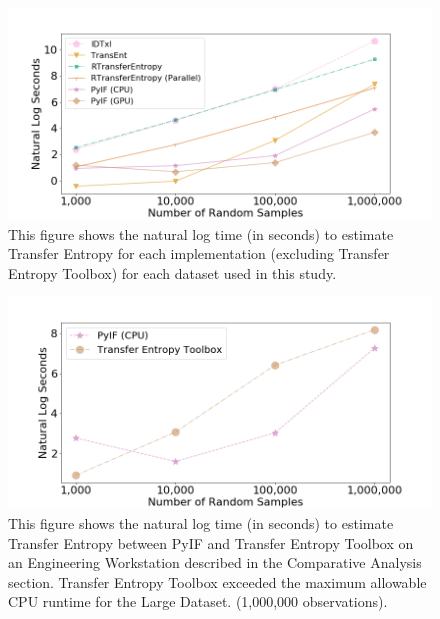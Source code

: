 \begin{figure}
  \centerline{\includegraphics[scale=0.8]{figures/PyIF/WallTime-TE.png}}
  \caption{This figure shows the natural log time (in seconds) to estimate Transfer Entropy for each implementation (excluding Transfer Entropy Toolbox) for each dataset used in this study. }
  \label{TE-walltime}
\end{figure}


\begin{figure}
  \centerline{\includegraphics[scale=0.8]{figures/PyIF/WallTime-TE2.png}}
  \caption{This figure shows the natural log time (in seconds) to estimate Transfer Entropy between PyIF and Transfer Entropy Toolbox on an Engineering Workstation described in the Comparative Analysis section. Transfer Entropy Toolbox exceeded the maximum allowable CPU runtime for the Large Dataset. (1,000,000 observations). }
  \label{TE-walltime2}
\end{figure}

\clearpage


